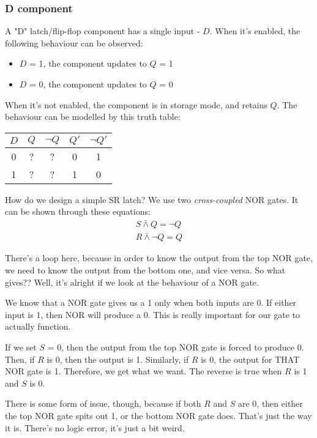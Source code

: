 \documentclass[11pt,a4paper,titlepage,dvipsnames,cmyk]{scrartcl}
\begin{document}
\subsubsection{D component}%
\label{ssub:D}
A "D" latch/flip-flop component has a single input - $D$. When it's
enabled, the following behaviour can be observed:
\begin{itemize}
    \item $D$ = 1, the component updates to $Q$ = 1
    \item $D$ = 0, the component updates to $Q$ = 0
\end{itemize}

When it's not enabled, the component is in storage mode, and retains $Q$.
The behaviour can be modelled by this truth table:
\begin{center}
    \begin{tabular}{|c|c c|c c|}
        \hline
        $D$ & $Q$ & $\neg Q$ & $Q'$ & $\neg Q'$ \\ \hline
        0 & ? & ? & 0 & 1 \\ \hline
        1 & ? & ? & 1 & 0 \\ \hline
    \end{tabular}
\end{center}

How do we design a simple SR latch? We use two \textit{cross-coupled} NOR
gates. It can be shown through these equations:
\begin{align*}
    S \bar \wedge Q = \neg Q \\
    R \bar \wedge \neg Q = Q
\end{align*}

There's a loop here, because in order to know the output from the top NOR
gate, we need to know the output from the bottom one, and vice versa. So
what gives?? Well, it's alright if we look at the behaviour of a NOR gate.

We know that a NOR gate gives us a 1 only when both inputs are 0. If
either input is 1, then NOR will produce a 0. This is really important for
our gate to actually function.

If we set $S$ = 0, then the output from the top NOR gate is forced to
produce 0. Then, if $R$ is 0, then the output is 1. Similarly, if $R$ is 0,
the output for THAT NOR gate is 1. Therefore, we get what we want. The
reverse is true when $R$ is 1 and $S$ is 0.

There is some form of issue, though, because if both $R$ and $S$ are 0,
then either the top NOR gate spits out 1, or the bottom NOR gate does.
That's just the way it is. There's no logic error, it's just a bit weird.
\end{document}
